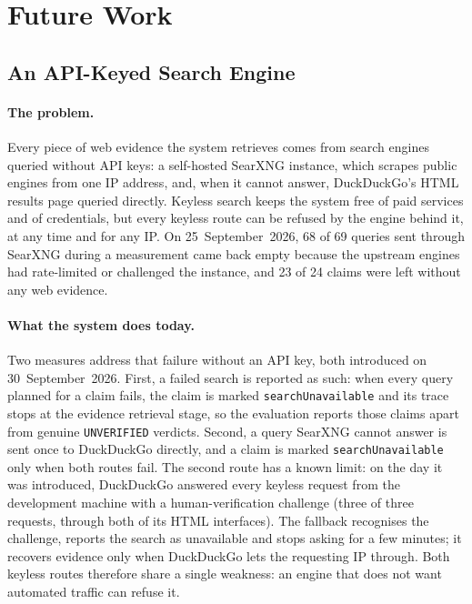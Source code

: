 
\section{Future Work}
\label{sec:future-work}

\subsection{An API-Keyed Search Engine}
\label{subsec:future-keyed-search}

\paragraph{The problem.} Every piece of web evidence the system
retrieves comes from search engines queried without API keys: a
self-hosted SearXNG instance, which scrapes public engines from one IP
address, and, when it cannot answer, DuckDuckGo's HTML results page
queried directly. Keyless search keeps the system free of paid
services and of credentials, but every keyless route can be refused
by the engine behind it, at any time and for any IP. On
25~September~2026, 68 of 69 queries sent through SearXNG during a
measurement came back empty because the upstream engines had
rate-limited or challenged the instance, and 23 of 24 claims were left
without any web evidence.

\paragraph{What the system does today.} Two measures address that
failure without an API key, both introduced on 30~September~2026.
First, a failed search is reported as such: when every query planned
for a claim fails, the claim is marked \texttt{searchUnavailable} and
its trace stops at the evidence retrieval stage, so the evaluation
reports those claims apart from genuine \texttt{UNVERIFIED} verdicts.
Second, a query SearXNG cannot answer is sent once to DuckDuckGo
directly, and a claim is marked \texttt{searchUnavailable} only when
both routes fail. The second route has a known limit: on the day it
was introduced, DuckDuckGo answered every keyless request from the
development machine with a human-verification challenge (three of
three requests, through both of its HTML interfaces). The fallback
recognises the challenge, reports the search as unavailable and stops
asking for a few minutes; it recovers evidence only when DuckDuckGo
lets the requesting IP through. Both keyless routes therefore share a
single weakness: an engine that does not want automated traffic can
refuse it.

